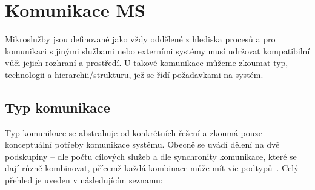 \section{Komunikace MS}\label{sec:msa-communication}

Mikroslužby jsou definované jako vždy oddělené z hlediska procesů a pro komunikaci s jinými službami nebo externími systémy musí udržovat kompatibilní  vůči jejich rozhraní a prostředí.
U takové komunikace můžeme zkoumat typ, technologii a hierarchii/strukturu, jež se řídí požadavkami na systém.



\subsection{Typ komunikace}\label{subsec:msa-communication-type}
Typ komunikace se abstrahuje od konkrétních řešení a zkoumá pouze konceptuální potřeby komunikace systému.
Obecně se uvádí dělení na dvě podskupiny – dle počtu cílových služeb a dle synchronity komunikace, které se dají různě kombinovat, přícemž každá kombinace může mít víc podtypů~\cite{msachris}.
Celý přehled je uveden v následujícím seznamu:


